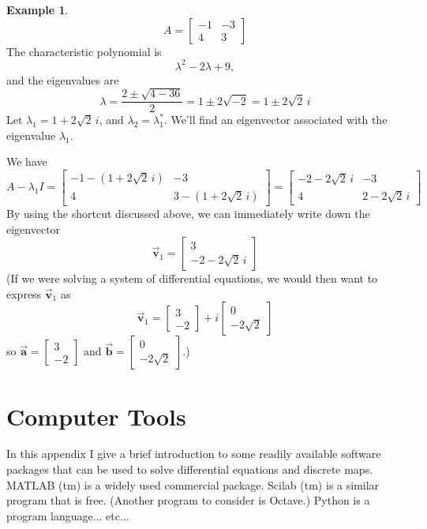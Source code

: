 \documentclass[reqno]{immbook}
\newcommand{\BA}{\vec{\textbf{a}}}
\newcommand{\BB}{\vec{\textbf{b}}}
\newcommand{\BV}{\vec{\textbf{v}}}
\numberwithin{equation}{chapter}
\numberwithin{question}{section}
\numberwithin{theorem}{chapter}
\numberwithin{figure}{chapter}
\theoremstyle{definition}
\newtheorem{example}{Example}[section]
\begin{document}
\begin{example}
\[
   A = \begin{bmatrix} -1 & -3 \\ 4 & 3 \end{bmatrix}
\]
The characteristic polynomial is
\[
  \lambda^2 - 2\lambda + 9,
\]
and the eigenvalues are
\[
  \lambda = \frac{2\pm \sqrt{4-36}}{2} = 1\pm 2\sqrt{-2}
    = 1 \pm 2 \sqrt{2} \, i
\]
Let $\lambda_1 = 1 + 2\sqrt{2}\, i$, and $\lambda_2 = \lambda_1^{*}$.
We'll find an eigenvector associated with
the eigenvalue $\lambda_1$.

We have
\[
   A - \lambda_1 I = \begin{bmatrix}
                        -1-(1+2\sqrt{2}\,i) & -3 \\
			4 & 3-(1+2\sqrt{2}\,i)
                     \end{bmatrix}
		   = \begin{bmatrix}
		        -2-2\sqrt{2}\, i & -3 \\
			4 & 2-2\sqrt{2}\,i
		     \end{bmatrix}
\]
By using the shortcut discussed above, we can
immediately write down the eigenvector
\[
  \BV_1 = \begin{bmatrix} 3 \\ -2-2\sqrt{2}\, i \end{bmatrix}
\]
(If we were solving a system of differential equations, we would
then want to express $\BV_1$ as
\[
   \BV_1 = \begin{bmatrix} 3 \\ -2 \end{bmatrix}
           + i \begin{bmatrix} 0 \\ -2\sqrt{2} \end{bmatrix}
\]
so $\BA = \begin{bmatrix} 3 \\ -2\end{bmatrix}$
and $\BB = \begin{bmatrix} 0 \\ -2\sqrt{2} \end{bmatrix}$.)
\end{example}
%
%
%
\chapter{Computer Tools}
%
%
In this appendix I give a brief introduction to some
readily available software packages that can be used to solve
differential equations and discrete maps.  MATLAB (tm)
is a widely used commercial package.
Scilab (tm)\cite{SCILAB} is a similar program that is free.
(Another program to consider is Octave.)
Python is a program language... etc...
\end{document}
